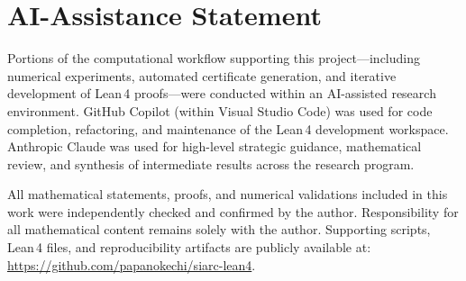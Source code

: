 \documentclass[11pt,a4paper]{article}
\theoremstyle{plain}
\theoremstyle{definition}
\theoremstyle{remark}
\begin{document}

\section*{AI-Assistance Statement}

Portions of the computational workflow supporting this project---including
numerical experiments, automated certificate generation, and iterative
development of Lean\,4 proofs---were conducted within an AI-assisted
research environment.  GitHub Copilot (within Visual Studio Code) was
used for code completion, refactoring, and maintenance of the Lean\,4
development workspace.  Anthropic Claude was used for high-level
strategic guidance, mathematical review, and synthesis of intermediate
results across the research program.

All mathematical statements, proofs, and numerical validations included
in this work were independently checked and confirmed by the author.
Responsibility for all mathematical content remains solely with the
author.  Supporting scripts, Lean\,4 files, and reproducibility artifacts
are publicly available at:
\url{https://github.com/papanokechi/siarc-lean4}.
\end{document}
